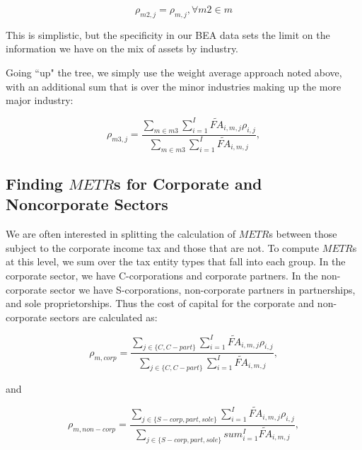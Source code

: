 \documentclass[article,11pt,letterpaper,fleqn]{article}
\theoremstyle{definition}
\numberwithin{equation}{section}
\begin{document}
\begin{equation} 
\rho_{m2,j} = \rho_{m,j}, \forall m2 \in m
\end{equation}

This is simplistic, but the specificity in our BEA data sets the limit on the information we have on the mix of assets by industry.

Going ``up" the tree, we simply use the weight average approach noted above, with an additional sum that is over the minor industries making up the more major industry:

\begin{equation}
\rho_{m3,j} = \frac{\sum_{m\in m3}\sum_{i=1}^{I}\widetilde{FA}_{i,m,j}\rho_{i,j}}{\sum_{m\in m3}\sum_{i=1}^{I}\widetilde{FA}_{i,m,j}} ,
\end{equation}

\subsection{Finding $METR$s for Corporate and Noncorporate Sectors}

We are often interested in splitting the calculation of $METR$s between those subject to the corporate income tax and those that are not.  To compute $METR$s at this level, we sum over the tax entity types that fall into each group.  In the corporate sector, we have C-corporations and corporate partners.  In the non-corporate sector we have S-corporations, non-corporate partners in partnerships, and sole proprietorships.  Thus the cost of capital for the corporate and non-corporate sectors are calculated as:

\begin{equation}
\rho_{m,corp} = \frac{\sum_{j\in\{C,C-part\}}\sum_{i=1}^{I}\widetilde{FA}_{i,m,j}\rho_{i,j}}{\sum_{j\in\{C,C-part\}}\sum_{i=1}^{I}\widetilde{FA}_{i,m,j}} ,
\end{equation}

and

\begin{equation}
\rho_{m,non-corp} = \frac{\sum_{j\in\{S-corp,part,sole\}}\sum_{i=1}^{I}\widetilde{FA}_{i,m,j}\rho_{i,j}}{\sum_{j\in\{S-corp,part,sole\}}sum_{i=1}^{I}\widetilde{FA}_{i,m,j}} ,
\end{equation}
\end{document}

